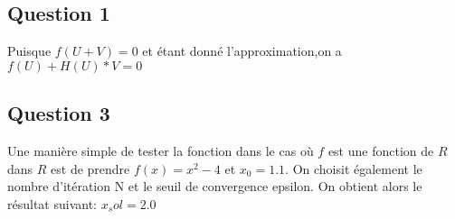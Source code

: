 \subsection {Question 1} 
Puisque $f(U+V)=0$ et étant donné l'approximation,on a
\newline
 $f(U)+H(U)*V=0$

\subsection{Question 3}

Une manière simple de tester la fonction dans le cas où $f$ est une fonction de $R$ dans $R$ est de prendre $f(x)=x^2-4$ et $x_0=1.1$. On choisit également le nombre d'itération N et le seuil de convergence epsilon. On obtient alors le résultat suivant:
\newline
$x_sol=2.0$
